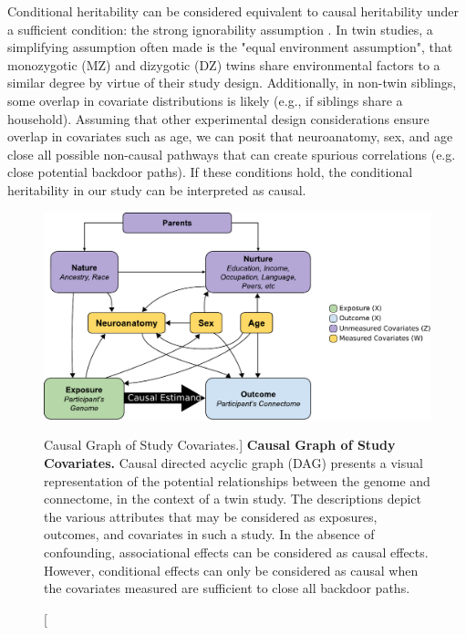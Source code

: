 Conditional heritability can be considered equivalent to causal heritability under a sufficient condition: the strong ignorability assumption \cite{rosenbaum1983central}.  In twin studies, a simplifying assumption often made is the "equal environment assumption", that monozygotic (MZ) and dizygotic (DZ) twins share environmental factors to a similar degree by virtue of their study design. Additionally, in non-twin siblings, some overlap in covariate distributions is likely (e.g., if siblings share a household). Assuming that other experimental design considerations ensure overlap in covariates such as age, we can posit that neuroanatomy, sex, and age close all possible non-causal pathways that can create spurious correlations (e.g. close potential backdoor paths). If these conditions hold, the conditional heritability in our study can be interpreted as causal. 


\begin{figure}
\centering
\includegraphics[width=0.8\linewidth]{figures/herit/dag.pdf}
\caption
[Causal Graph of Study Covariates.]
{\textbf{Causal Graph of Study Covariates.} Causal directed acyclic graph (DAG) presents a visual representation of the potential relationships between the genome and connectome, in the context of a twin study. The descriptions depict the various attributes that may be considered as exposures, outcomes, and covariates in such a study. In the absence of confounding, associational effects can be considered as causal effects. However, conditional effects can only be considered as causal when the covariates measured are sufficient to close all backdoor paths.}
\label{fig:dag}
\end{figure}

